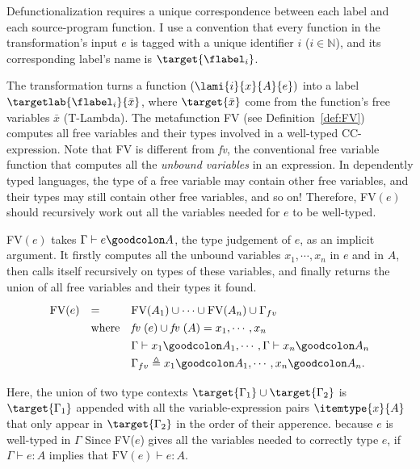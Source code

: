 Defunctionalization requires a unique correspondence between each label and each source-program function.
I use a convention that every function in the transformation's input $e$ is tagged with a unique identifier $i$ ($i \in \mathbb{N}$), and its corresponding label's name is $\target{\flabel_i}$.

The transformation turns a function $(\lami{i}{x}{A}{e})$ into a label $\targetlab{\flabel_i}{\bar{x}}$, where $\target{\bar{x}}$ come from the function's free variables $\bar{x}$ (T-Lambda). The metafunction FV (see Definition~\ref{def:FV}) computes all free variables and their types involved in a well-typed CC-expression. Note that FV is different from \textit{fv}, the conventional free variable function that computes all the \textit{unbound variables} in an expression. In dependently typed languages, the type of a free variable may contain other free variables, and their types may still contain other free variables, and so on! Therefore, FV$(e)$ should recursively work out all the variables needed for $e$ to be well-typed. 

\begin{definition}FV$(e)$ takes $\Gamma \vdash e \goodcolon A$, the type judgement of $e$, as an implicit argument. It firstly computes all the unbound variables $x_1, \cdots, x_n$ in $e$ and in $A$, then calls itself recursively on types of these variables, and finally returns the union of all free variables and their types it found.
\begin{equation*}
\renewcommand{\arraystretch}{1.3}
\begin{array}{l l l}
	\text{FV}(e) & = & \text{FV}(A_1) \cup \cdots \cup \text{FV}(A_n) \cup \Gamma_{fv}\\
	& \text{where} & \textit{fv }(e) \cup \textit{fv }(A) = x_1, \cdots, x_n\\
	& & \Gamma \vdash x_1 \goodcolon A_1, \cdots, \Gamma \vdash x_n \goodcolon A_n\\
	& & \Gamma_{fv} \triangleq x_1 \goodcolon A_1, \cdots, x_n \goodcolon A_n.\\
\end{array}
\end{equation*}
\label{def:FV}
\end{definition}

Here, the union of two type contexts $\target{\Gamma_1} \cup \target{\Gamma_2}$ is $\target{\Gamma_1}$ appended with all the variable-expression pairs $\itemtype{x}{A}$ that only appear in $\target{\Gamma_2}$ in the order of their apperence. because $e$ is well-typed in $\Gamma$
Since FV($e$) gives all the variables needed to correctly type $e$, if $\Gamma \vdash e : A$ implies that $\text{FV}(e) \vdash e : A$.

